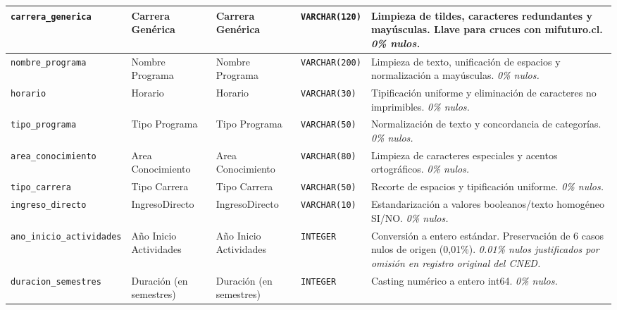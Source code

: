 {\begin{longtable}{|p{3.0cm}|p{2.0cm}|p{2.0cm}|p{1.6cm}|p{6.4cm}|}
\hline
\texttt{\footnotesize carrera\_generica} & Carrera Genérica & Carrera Genérica & \texttt{\footnotesize VARCHAR(120)} & Limpieza de tildes, caracteres redundantes y mayúsculas. Llave para cruces con mifuturo.cl. \newline \textit{\footnotesize 0\% nulos.} \\
\hline
\texttt{\footnotesize nombre\_programa} & Nombre Programa & Nombre Programa & \texttt{\footnotesize VARCHAR(200)} & Limpieza de texto, unificación de espacios y normalización a mayúsculas. \newline \textit{\footnotesize 0\% nulos.} \\
\hline
\texttt{\footnotesize horario} & Horario & Horario & \texttt{\footnotesize VARCHAR(30)} & Tipificación uniforme y eliminación de caracteres no imprimibles. \newline \textit{\footnotesize 0\% nulos.} \\
\hline
\texttt{\footnotesize tipo\_programa} & Tipo Programa & Tipo Programa & \texttt{\footnotesize VARCHAR(50)} & Normalización de texto y concordancia de categorías. \newline \textit{\footnotesize 0\% nulos.} \\
\hline
\texttt{\footnotesize area\_conocimiento} & Area Conocimiento & Area Conocimiento & \texttt{\footnotesize VARCHAR(80)} & Limpieza de caracteres especiales y acentos ortográficos. \newline \textit{\footnotesize 0\% nulos.} \\
\hline
\texttt{\footnotesize tipo\_carrera} & Tipo Carrera & Tipo Carrera & \texttt{\footnotesize VARCHAR(50)} & Recorte de espacios y tipificación uniforme. \newline \textit{\footnotesize 0\% nulos.} \\
\hline
\texttt{\footnotesize ingreso\_directo} & IngresoDirecto & IngresoDirecto & \texttt{\footnotesize VARCHAR(10)} & Estandarización a valores booleanos/texto homogéneo SI/NO. \newline \textit{\footnotesize 0\% nulos.} \\
\hline
\texttt{\footnotesize ano\_inicio\_actividades} & Año Inicio Actividades & Año Inicio Actividades & \texttt{\footnotesize INTEGER} & Conversión a entero estándar. Preservación de 6 casos nulos de origen (0,01\%). \newline \textit{\footnotesize 0.01\% nulos justificados por omisión en registro original del CNED.} \\
\hline
\texttt{\footnotesize duracion\_semestres} & Duración (en semestres) & Duración (en semestres) & \texttt{\footnotesize INTEGER} & Casting numérico a entero int64. \newline \textit{\footnotesize 0\% nulos.} \\

\end{longtable}}
